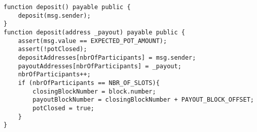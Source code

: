 \begin{lstlisting}
function deposit() payable public {
    deposit(msg.sender);
}
function deposit(address _payout) payable public {
    assert(msg.value == EXPECTED_POT_AMOUNT);
    assert(!potClosed);
    depositAddresses[nbrOfParticipants] = msg.sender;
    payoutAddresses[nbrOfParticipants] = _payout;
    nbrOfParticipants++;
    if (nbrOfParticipants == NBR_OF_SLOTS){
        closingBlockNumber = block.number;
        payoutBlockNumber = closingBlockNumber + PAYOUT_BLOCK_OFFSET;
        potClosed = true;
    }
}
\end{lstlisting}

